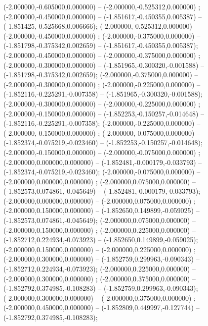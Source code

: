  (-2.000000,-0.605000,0.000000) -- (-2.000000,-0.525312,0.000000) ;
 (-2.000000,-0.450000,0.000000) -- (-1.851617,-0.450355,0.005387) -- (-1.851425,-0.525668,0.006666);
 (-2.000000,-0.525312,0.000000) -- (-2.000000,-0.450000,0.000000) ;
 (-2.000000,-0.375000,0.000000) -- (-1.851798,-0.375342,0.002659) -- (-1.851617,-0.450355,0.005387);
 (-2.000000,-0.450000,0.000000) -- (-2.000000,-0.375000,0.000000) ;
 (-2.000000,-0.300000,0.000000) -- (-1.851965,-0.300320,-0.001588) -- (-1.851798,-0.375342,0.002659);
 (-2.000000,-0.375000,0.000000) -- (-2.000000,-0.300000,0.000000) ;
 (-2.000000,-0.225000,0.000000) -- (-1.852116,-0.225291,-0.007358) -- (-1.851965,-0.300320,-0.001588);
 (-2.000000,-0.300000,0.000000) -- (-2.000000,-0.225000,0.000000) ;
 (-2.000000,-0.150000,0.000000) -- (-1.852253,-0.150257,-0.014648) -- (-1.852116,-0.225291,-0.007358);
 (-2.000000,-0.225000,0.000000) -- (-2.000000,-0.150000,0.000000) ;
 (-2.000000,-0.075000,0.000000) -- (-1.852374,-0.075219,-0.023460) -- (-1.852253,-0.150257,-0.014648);
 (-2.000000,-0.150000,0.000000) -- (-2.000000,-0.075000,0.000000) ;
 (-2.000000,0.000000,0.000000) -- (-1.852481,-0.000179,-0.033793) -- (-1.852374,-0.075219,-0.023460);
 (-2.000000,-0.075000,0.000000) -- (-2.000000,0.000000,0.000000) ;
 (-2.000000,0.075000,0.000000) -- (-1.852573,0.074861,-0.045649) -- (-1.852481,-0.000179,-0.033793);
 (-2.000000,0.000000,0.000000) -- (-2.000000,0.075000,0.000000) ;
 (-2.000000,0.150000,0.000000) -- (-1.852650,0.149899,-0.059025) -- (-1.852573,0.074861,-0.045649);
 (-2.000000,0.075000,0.000000) -- (-2.000000,0.150000,0.000000) ;
 (-2.000000,0.225000,0.000000) -- (-1.852712,0.224934,-0.073923) -- (-1.852650,0.149899,-0.059025);
 (-2.000000,0.150000,0.000000) -- (-2.000000,0.225000,0.000000) ;
 (-2.000000,0.300000,0.000000) -- (-1.852759,0.299963,-0.090343) -- (-1.852712,0.224934,-0.073923);
 (-2.000000,0.225000,0.000000) -- (-2.000000,0.300000,0.000000) ;
 (-2.000000,0.375000,0.000000) -- (-1.852792,0.374985,-0.108283) -- (-1.852759,0.299963,-0.090343);
 (-2.000000,0.300000,0.000000) -- (-2.000000,0.375000,0.000000) ;
 (-2.000000,0.450000,0.000000) -- (-1.852809,0.449997,-0.127744) -- (-1.852792,0.374985,-0.108283);
